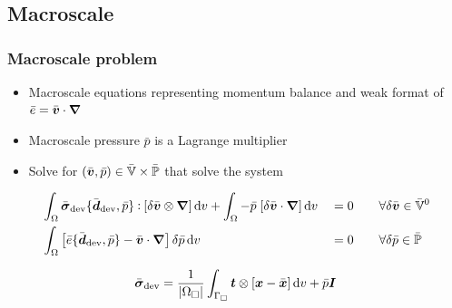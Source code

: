 \documentclass[11pt]{beamer} %
\newcommand{\prescribed}{\mathrm{p}}
\newcommand{\external}{\mathrm{ext}}
\begin{document}
\subsection{Macroscale}
\begin{frame}
 \frametitle{Macroscale problem}
\begin{itemize}
 \item Macroscale equations representing momentum balance and weak format of $\bar{e} = \bar{\boldsymbol{v}}\cdot\boldsymbol{\nabla}$
 \item Macroscale pressure $\bar{p}$ is a Lagrange multiplier
 \item Solve for $(\bar{\boldsymbol{v}}, \bar{p}) \in \bar{\mathbb{V}}\times\bar{\mathbb{P}}$ that solve the system
\end{itemize}

\begin{alignat*}{3}
 &\int_\Omega \bar{\boldsymbol{\sigma}}_{\mathrm{dev}}\{\bar{\boldsymbol{d}}_{\mathrm{dev}},\bar{p}\} \mathbin{\vcentcolon} [\delta\bar{\boldsymbol{v}}\mathbin{\otimes} \boldsymbol{\nabla}] \operatorname{d \!} v + \int_\Omega -\bar{p}\;[\delta\bar{\boldsymbol{v}}\cdot\boldsymbol{\nabla}]\operatorname{d \!} v &&= 0 &\quad& \forall \delta\bar{\boldsymbol{v}}\in \bar{\mathbb{V}}^0\\
 &\int_\Omega \left[\bar{e}\{\bar{\boldsymbol{d}}_{\mathrm{dev}},\bar{p}\} - \bar{\boldsymbol{v}}\cdot\boldsymbol{\nabla}\right]\delta\bar{p} \operatorname{d \!} v &&= 0&\quad& \forall \delta\bar{p}\in \bar{\mathbb{P}}
\end{alignat*}

\begin{align*}
 \bar{\boldsymbol{\sigma}}_{\mathrm{dev}} = \frac{1}{|\Omega_\Box|} \int_{\Gamma_\Box} \boldsymbol{t} \mathbin{\otimes} [\boldsymbol{x} - \bar{\boldsymbol{x}}]\operatorname{d \!} v + \bar{p}\boldsymbol{I}
\end{align*}

% 
\end{frame}
\end{document}
